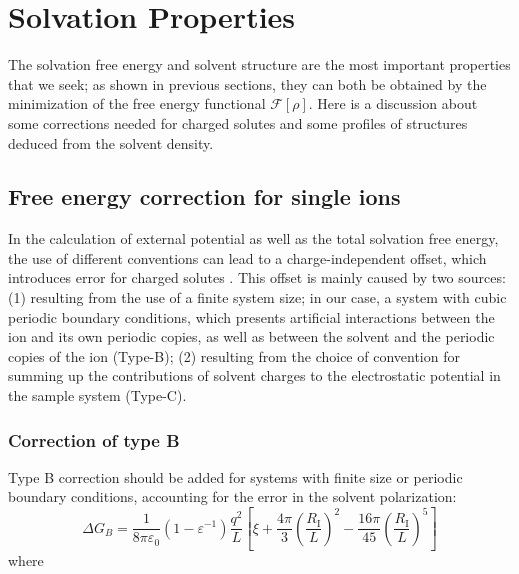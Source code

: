 
\chapter{Solvation Properties\label{chpt:solvation-properties}}

The solvation free energy and solvent structure are the most important
properties that we seek; as shown in previous sections, they can both be
obtained by the minimization of the free energy functional $\mathcal{F}[\rho]$.
Here is a discussion about some corrections needed for charged solutes
and some profiles of structures deduced from the solvent density.

\section{Free energy correction for single ions\label{sec:Free-energy-correction}}

In the calculation of external potential as well as the total solvation
free energy, the use of different conventions can lead to a charge-independent
offset, which introduces error for charged solutes \citep{Kastenholz_2006_I,Kastenholz_2006_II,Hunenberger_book}.
This offset is mainly caused by two sources: (1) resulting from the
use of a finite system size; in our case, a system with cubic periodic
boundary conditions, which presents artificial interactions between
the ion and its own periodic copies, as well as between the solvent
and the periodic copies of the ion (Type-B); (2) resulting from the
choice of convention for summing up the contributions of solvent charges
to the electrostatic potential in the sample system (Type-C).

\subsection{Correction of type B}

Type B correction should be added for systems with finite size or
periodic boundary conditions, accounting for the error in the solvent
polarization: 
\begin{equation}
\Delta G_{B}=\frac{1}{8\pi\varepsilon_{0}}\left(1-\varepsilon^{-1}\right)\frac{q^{2}}{L}\left[\xi+\frac{4\pi}{3}\left(\frac{R_{\mathrm{I}}}{L}\right)^{2}-\frac{16\pi}{45}\left(\frac{R_{\mathrm{I}}}{L}\right)^{5}\right]\label{eq:corr-B}
\end{equation}
where

